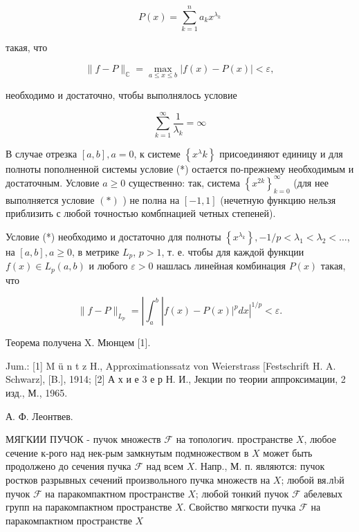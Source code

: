 \documentclass[10pt]{article}
\begin{document}
\[

P(x)=\sum_{k=1}^{n} a_{k} x^{\lambda_{k}}

\]



такая, что



\[

\|f-P\|_{\mathbb{C}}=\max _{a \leqslant x \leqslant b}|f(x)-P(x)|<\varepsilon,

\]



необходимо и достаточно, чтобы выполнялось условие



\[

\sum_{k=1}^{\infty} \frac{1}{\lambda_{k}}=\infty

\]



В случае отрезка $[a, b], a=0$, к системе $\left\{x^{\lambda} k\right\}$ присоединяют единицу и для полноты пополненной системы условие (*) остается по-прежнему необходимым и достаточным. Условие $a \geqslant 0$ существенно: так, система $\left\{x^{2 k}\right\}_{k=0}^{\infty}$ (для нее выполняется условие $(*)$ ) не полна на $[-1,1]$ (нечетную функцию нельзя приблизить с любой точностью комбпнацией четных степеней).



Условие (*) необходимо и достаточно для полноты $\left\{x^{\lambda_{k}}\right\},-1 / p<\lambda_{1}<\lambda_{2}<\ldots$, на $[a, b], a \geqslant 0$, в метрике $L_{p}$, $p>1$, т. е. чтобы для каждой функции $f(x) \in L_{p}(a, b)$ и любого $\varepsilon>0$ нашлась линейная комбинация $P(x)$ такая, что



\[

\|f-P\|_{L_{p}}=\left|\int_{a}^{b}\right| f(x)-\left.\left.P(x)\right|^{p} d x\right|^{1 / p}<\varepsilon .

\]



Теорема получена $\mathrm{X}$. Мюнцем [1].



Jum.: [1] M ü n t z H., Approximationssatz von Weierstrass [Festschrift H. A. Schwarz], [B.], 1914; [2] А х и е 3 е р Н. И., Јекции по теории аппроксимации, 2 изд., М., 1965.



А. Ф. Леонтвев.



МЯГКИИ ПУЧОК - пучок множеств $\mathscr{\mathscr { F }}$ на топологич. пространстве $X$, любое сечение к-рого над нек-рым замкнутым подмножеством в $X$ может быть продолжено до сечения пучка $\mathscr{F}$ над всем $X$. Напр., М. п. являются: пучок ростков разрывных сечений произвольного пучка множеств на $X$; любой вя.лbй пучок $\mathscr{F}$ на паракомпактном пространстве $X$; любой тонкий пучок $\mathscr{F}$ абелевых групп на паракомпактном пространстве $X$. Свойство мягкости пучка $\mathscr{F}$ на паракомпактном пространстве $X$
\end{document}
